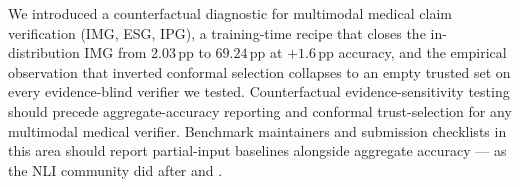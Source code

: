 \documentclass{article}
\begin{document}
We introduced a counterfactual diagnostic for multimodal medical
claim verification (IMG, ESG, IPG), a training-time recipe that
closes the in-distribution IMG from $2.03$\,pp to $69.24$\,pp at
$+1.6$\,pp accuracy, and the empirical observation that inverted
conformal selection collapses to an empty trusted set on every
evidence-blind verifier we tested. Counterfactual
evidence-sensitivity testing should precede aggregate-accuracy
reporting and conformal trust-selection for any multimodal medical
verifier. Benchmark maintainers and submission checklists in this
area should report partial-input baselines alongside aggregate
accuracy --- as the NLI community did after
\citet{gururangan2018annotation} and \citet{poliak2018hypothesis}.



\end{document}
